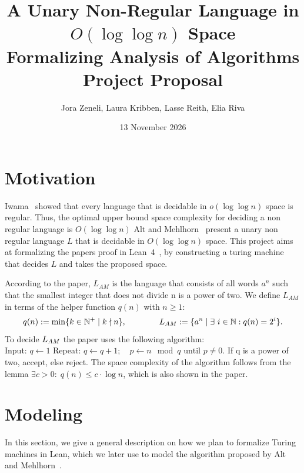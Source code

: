 \documentclass[UTF8]{article}
\renewcommand{\L}{{L_{\tiny{AM}}}}
\begin{document}
\title{
  A Unary Non-Regular Language in $O(\log \log n)$ Space \\
    \large
        Formalizing Analysis of Algorithms \\
        Project Proposal}

\author{Jora Zeneli, Laura Kribben, Lasse Reith, Elia Riva}

\date{13 November 2026}

\maketitle

\tableofcontents

\newpage

\section{Motivation}
Iwama~\cite{iwamaregular} showed that every language that is decidable in $o(\log \log n)$ space is regular.
Thus, the optimal upper bound space complexity for deciding a non regular language is $O(\log \log n)$ 
Alt and Mehlhorn~\cite{Lang-OneSymbAlph-LogLogn-HM-1975} present a unary non regular language $L$ that is decidable in $O(\log \log n)$ space. 
This project aims at formalizing the papers proof in Lean~4~\cite{lean4}, by constructing a turing machine that decides $L$ and takes the proposed space.

According to the paper, $L_{AM}$ is the language that consists of all words $a^n$ such that the smallest integer that does not divide n is a power of two.
We define $L_{AM}$ in terms of the helper function $q(n)$ with $n \geq 1$:
$$ {q(n) := \min\{ k\in\mathbb N^+ \mid k\nmid n\}}, \qquad \qquad  \L := \{a^n \mid \exists\ i \in \mathbb N : q(n) = 2^i  \}.$$
To decide $\L$ the paper uses the following algorithm: \\
Input: 
$q \leftarrow 1$
Repeat: 
$q \leftarrow q + 1; \quad p \leftarrow n \mod q \text{ until } p \neq 0$.
If q is a power of two, accept, else reject. 
The space complexity of the algorithm follows from the lemma $\exists c>0:\; q(n) \leq c \cdot \log n$, which is also shown in the paper.

\section{Modeling} 
In this section, we give a general description on how we plan to formalize Turing machines in Lean, which we later use to model the algorithm proposed by Alt and Mehlhorn~\cite{Lang-OneSymbAlph-LogLogn-HM-1975}.
\end{document}
